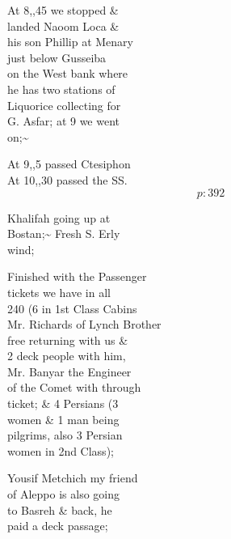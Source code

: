 \documentclass{report}
\begin{document}
	\par{
 	At 8,,45 we stopped \&\ \\landed Naoom Loca \&\ \\his son Phillip at Menary\ \\just below Gusseiba\ \\on the West bank where\ \\he has two stations of\ \\Liquorice collecting for\ \\G. Asfar; at 9 we went\ \\on;\~{}\ \\
	}

	\par{
 	At 9,,5 passed Ctesiphon\ \\At 10,,30 passed the SS.\ \\
  \[p: 392 \]

	}



	\par{
 	Khalifah going up at\ \\Bostan;\~{} Fresh S. Erly\ \\wind;\ \\
	}

	\par{
 	Finished with the Passenger\ \\tickets we have in all\ \\240 (6 in 1st Class Cabins\ \\Mr. Richards of Lynch Brother\ \\free returning with us \&\ \\2 deck people with him,\ \\Mr. Banyar the Engineer\ \\of the Comet with through\ \\ticket; \& 4 Persians (3\ \\women \& 1 man being\ \\pilgrims, also 3 Persian\ \\women in 2nd Class);\ \\
	}

	\par{
 	Yousif Metchich my friend\ \\of Aleppo is also going\ \\to Basreh \& back, he\ \\paid a deck passage;\ \\
	}
\end{document}
